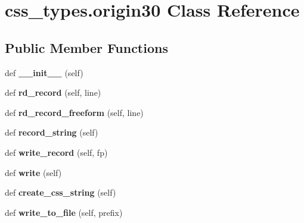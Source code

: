 \hypertarget{classcss__types_1_1origin30}{}\section{css\+\_\+types.\+origin30 Class Reference}
\label{classcss__types_1_1origin30}
\subsection*{Public Member Functions}
\begin{DoxyCompactItemize}
\item 
\hypertarget{classcss__types_1_1origin30_a301454b358176b9dc88d100a57615b02}{}def {\bfseries \+\_\+\+\_\+init\+\_\+\+\_\+} (self)\label{classcss__types_1_1origin30_a301454b358176b9dc88d100a57615b02}

\item 
\hypertarget{classcss__types_1_1origin30_a0893d69c6c795cd466e8f12beb083c61}{}def {\bfseries rd\+\_\+record} (self, line)\label{classcss__types_1_1origin30_a0893d69c6c795cd466e8f12beb083c61}

\item 
\hypertarget{classcss__types_1_1origin30_a4868bf72f6140dddf8798557028a4038}{}def {\bfseries rd\+\_\+record\+\_\+freeform} (self, line)\label{classcss__types_1_1origin30_a4868bf72f6140dddf8798557028a4038}

\item 
\hypertarget{classcss__types_1_1origin30_a7540dc2156403bf45b8e5bc729600e95}{}def {\bfseries record\+\_\+string} (self)\label{classcss__types_1_1origin30_a7540dc2156403bf45b8e5bc729600e95}

\item 
\hypertarget{classcss__types_1_1origin30_a4a093462242543f9d9c8dd95e5ba28fa}{}def {\bfseries write\+\_\+record} (self, fp)\label{classcss__types_1_1origin30_a4a093462242543f9d9c8dd95e5ba28fa}

\item 
\hypertarget{classcss__types_1_1origin30_a124067a84c76f3abb89de3338b86ba6d}{}def {\bfseries write} (self)\label{classcss__types_1_1origin30_a124067a84c76f3abb89de3338b86ba6d}

\item 
\hypertarget{classcss__types_1_1origin30_a97c2c793f8fa8dc7eae43a7b3f7fbbe1}{}def {\bfseries create\+\_\+css\+\_\+string} (self)\label{classcss__types_1_1origin30_a97c2c793f8fa8dc7eae43a7b3f7fbbe1}

\item 
\hypertarget{classcss__types_1_1origin30_a762ee9cc16bdcd42c962763ab70ff58f}{}def {\bfseries write\+\_\+to\+\_\+file} (self, prefix)\label{classcss__types_1_1origin30_a762ee9cc16bdcd42c962763ab70ff58f}


\end{DoxyCompactItemize}
